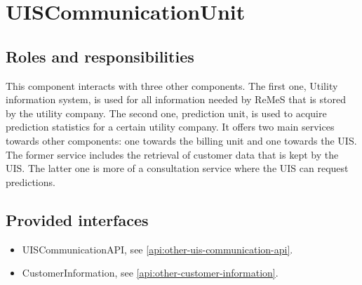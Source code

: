 \section{UISCommunicationUnit}
\label{element:uis-communication-unit}

\subsection{Roles and responsibilities}

\npar This component interacts with three other components. The first one,
Utility information system, is used for all information needed by ReMeS that is
stored by the utility company. The second one, prediction unit, is used to
acquire prediction statistics for a certain utility company. It offers two main
services towards other components: one towards the billing unit
and one towards the UIS. The former service includes the retrieval
of customer data that is kept by the UIS. The latter one is more of a
consultation service where the UIS can request predictions.

\subsection{Provided interfaces}

\begin{itemize}
  \item UISCommunicationAPI, see \ref{api:other-uis-communication-api}.
  \item CustomerInformation, see \ref{api:other-customer-information}.
\end{itemize}